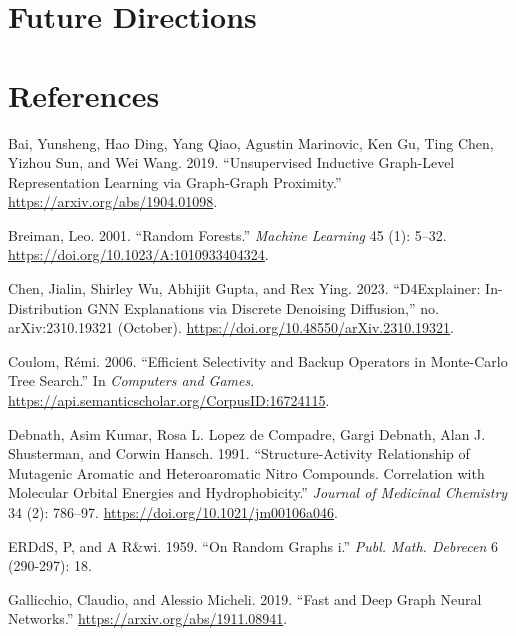 \documentclass[
  11pt,
  letterpaper,
]{article}
\newlength{\cslhangindent}
\newlength{\cslentryspacingunit} %
\newenvironment{CSLReferences}[2] %
 {%
  \setlength{\parindent}{0pt}
  \ifodd #1
  \let\oldpar\par
  \def\par{\hangindent=\cslhangindent\oldpar}
  \fi
  \setlength{\parskip}{#2\cslentryspacingunit}
 }%
 {}
\begin{document}
\hypertarget{future-directions}{%
\section{Future Directions}\label{future-directions}}

\pagebreak

\hypertarget{references}{%
\section{References}\label{references}}

\hypertarget{refs}{}
\begin{CSLReferences}{1}{0}
\leavevmode{}%
Bai, Yunsheng, Hao Ding, Yang Qiao, Agustin Marinovic, Ken Gu, Ting
Chen, Yizhou Sun, and Wei Wang. 2019. {``Unsupervised Inductive
Graph-Level Representation Learning via Graph-Graph Proximity.''}
\url{https://arxiv.org/abs/1904.01098}.

\leavevmode{}%
Breiman, Leo. 2001. {``Random Forests.''} \emph{Machine Learning} 45
(1): 5--32. \url{https://doi.org/10.1023/A:1010933404324}.

\leavevmode{}%
Chen, Jialin, Shirley Wu, Abhijit Gupta, and Rex Ying. 2023.
{``D4Explainer: In-Distribution GNN Explanations via Discrete Denoising
Diffusion,''} no. arXiv:2310.19321 (October).
\url{https://doi.org/10.48550/arXiv.2310.19321}.

\leavevmode{}%
Coulom, Rémi. 2006. {``Efficient Selectivity and Backup Operators in
Monte-Carlo Tree Search.''} In \emph{Computers and Games}.
\url{https://api.semanticscholar.org/CorpusID:16724115}.

\leavevmode{}%
Debnath, Asim Kumar, Rosa L. Lopez de Compadre, Gargi Debnath, Alan J.
Shusterman, and Corwin Hansch. 1991. {``Structure-Activity Relationship
of Mutagenic Aromatic and Heteroaromatic Nitro Compounds. Correlation
with Molecular Orbital Energies and Hydrophobicity.''} \emph{Journal of
Medicinal Chemistry} 34 (2): 786--97.
\url{https://doi.org/10.1021/jm00106a046}.

\leavevmode{}%
ERDdS, P, and A R\&wi. 1959. {``On Random Graphs i.''} \emph{Publ. Math.
Debrecen} 6 (290-297): 18.

\leavevmode{}%
Gallicchio, Claudio, and Alessio Micheli. 2019. {``Fast and Deep Graph
Neural Networks.''} \url{https://arxiv.org/abs/1911.08941}.


\end{CSLReferences}
\end{document}
